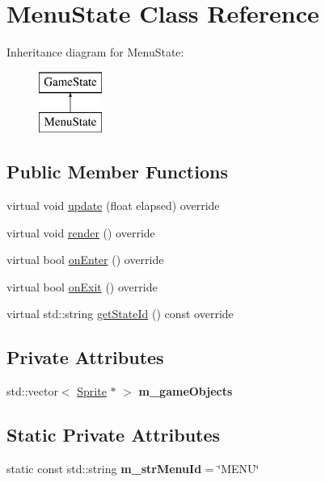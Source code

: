 \hypertarget{class_menu_state}{}\section{Menu\+State Class Reference}
\label{class_menu_state}
Inheritance diagram for Menu\+State\+:\begin{figure}[H]
\begin{center}
\leavevmode
\includegraphics[height=2.000000cm]{class_menu_state}
\end{center}
\end{figure}
\subsection*{Public Member Functions}
\begin{DoxyCompactItemize}
\item 
virtual void \mbox{\hyperlink{class_menu_state_ace168c6eaa32fd90e1e09828f46bcfbf}{update}} (float elapsed) override
\item 
virtual void \mbox{\hyperlink{class_menu_state_ac216e0b4c7f5c5d39520165c45af0da6}{render}} () override
\item 
virtual bool \mbox{\hyperlink{class_menu_state_a1c825d87d75a552440e0fc54a4428359}{on\+Enter}} () override
\item 
virtual bool \mbox{\hyperlink{class_menu_state_aae03dc2a5d860a3a1a2ea946cd3309a5}{on\+Exit}} () override
\item 
virtual std\+::string \mbox{\hyperlink{class_menu_state_a96131ebc632546458ccf8034f87a692b}{get\+State\+Id}} () const override
\end{DoxyCompactItemize}
\subsection*{Private Attributes}
\begin{DoxyCompactItemize}
\item 
\mbox{\label{class_menu_state_a5e5043c2d02a2a355f491b09e519a8cf}} 
std\+::vector$<$ \mbox{\hyperlink{class_sprite}{Sprite}} $\ast$ $>$ {\bfseries m\+\_\+game\+Objects}
\end{DoxyCompactItemize}
\subsection*{Static Private Attributes}
\begin{DoxyCompactItemize}
\item 
\mbox{\label{class_menu_state_ae5acc053ee13be25d518c53d93dea6bb}} 
static const std\+::string {\bfseries m\+\_\+str\+Menu\+Id} = \char`\"{}M\+E\+NU\char`\"{}
\end{DoxyCompactItemize}


